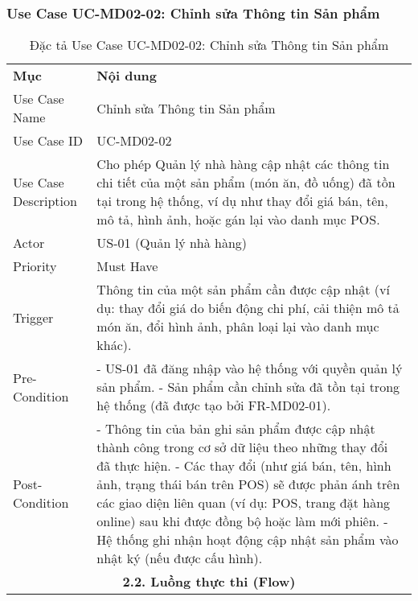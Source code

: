 \subsubsection{Use Case UC-MD02-02: Chỉnh sửa Thông tin Sản phẩm}

\begin{longtable}{|m{4cm}|p{11cm}|}
\caption{Đặc tả Use Case UC-MD02-02: Chỉnh sửa Thông tin Sản phẩm} \label{tab:uc_md02_02} \\
\hline

\endhead %

\hline
\endfoot %

\hline
\endlastfoot %
\multicolumn{2}{|c|}{\textbf{2.1. Tóm tắt (Summary)}} \\
\hline
\textbf{Mục} & \textbf{Nội dung} \\
\hline
Use Case Name & Chỉnh sửa Thông tin Sản phẩm \\
\hline
Use Case ID & UC-MD02-02 \\
\hline
Use Case Description & Cho phép Quản lý nhà hàng cập nhật các thông tin chi tiết của một sản phẩm (món ăn, đồ uống) đã tồn tại trong hệ thống, ví dụ như thay đổi giá bán, tên, mô tả, hình ảnh, hoặc gán lại vào danh mục POS. \\
\hline
Actor & US-01 (Quản lý nhà hàng) \\
\hline
Priority & Must Have \\
\hline
Trigger & Thông tin của một sản phẩm cần được cập nhật (ví dụ: thay đổi giá do biến động chi phí, cải thiện mô tả món ăn, đổi hình ảnh, phân loại lại vào danh mục khác). \\
\hline
Pre-Condition & - US-01 đã đăng nhập vào hệ thống với quyền quản lý sản phẩm. \newline - Sản phẩm cần chỉnh sửa đã tồn tại trong hệ thống (đã được tạo bởi FR-MD02-01). \\
\hline
Post-Condition & - Thông tin của bản ghi sản phẩm được cập nhật thành công trong cơ sở dữ liệu theo những thay đổi đã thực hiện. \newline - Các thay đổi (như giá bán, tên, hình ảnh, trạng thái bán trên POS) sẽ được phản ánh trên các giao diện liên quan (ví dụ: POS, trang đặt hàng online) sau khi được đồng bộ hoặc làm mới phiên. \newline - Hệ thống ghi nhận hoạt động cập nhật sản phẩm vào nhật ký (nếu được cấu hình). \\
\hline
\multicolumn{2}{|c|}{\textbf{2.2. Luồng thực thi (Flow)}} \\

\end{longtable}
